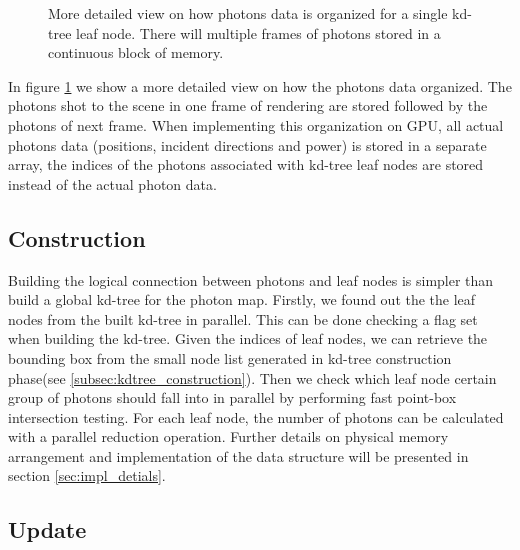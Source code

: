 \begin{figure}
    \centering
    \renewcommand{\thefigure}{\thechapter.\arabic{figure}}
    \caption[Detailed view on organization of photons data for a single leaf node]{More detailed view on how photons data is organized for a single kd-tree leaf node. There will multiple frames of photons stored in a continuous block of memory.}
    \label{fig:kd_leaf_photons_2}
\end{figure}

In figure \ref{fig:kd_leaf_photons_2} we show a more detailed view on how the photons data organized. The photons shot to the scene in one frame of rendering are stored followed by the photons of next frame. When implementing this organization on GPU, all actual photons data (positions, incident directions and power) is stored in a separate array, the indices of the photons associated with kd-tree leaf nodes are stored instead of the actual photon data.

\subsection{Construction}

Building the logical connection between photons and leaf nodes is simpler than build a global kd-tree for the photon map. Firstly, we found out the the leaf nodes from the built kd-tree in parallel. This can be done checking a flag set when building the kd-tree. Given the indices of leaf nodes, we can retrieve the bounding box from the small node list generated in kd-tree construction phase(see \ref{subsec:kdtree_construction}). Then we check which leaf node certain group of photons should fall into in parallel by performing fast point-box intersection testing. For each leaf node, the number of photons can be calculated with a parallel reduction operation. Further details on physical memory arrangement and implementation of the data structure  will be presented in section \ref{sec:impl_detials}.

\subsection{Update}

